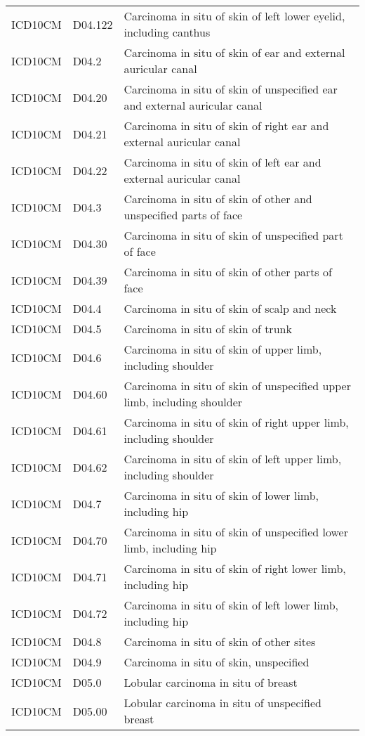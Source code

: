 \begin{longtable}{p{}p{}p{}}
  ICD10CM & D04.122 & Carcinoma in situ of skin of left lower eyelid, including canthus \\ 
  ICD10CM & D04.2 & Carcinoma in situ of skin of ear and external auricular canal \\ 
  ICD10CM & D04.20 & Carcinoma in situ of skin of unspecified ear and external auricular canal \\ 
  ICD10CM & D04.21 & Carcinoma in situ of skin of right ear and external auricular canal \\ 
  ICD10CM & D04.22 & Carcinoma in situ of skin of left ear and external auricular canal \\ 
  ICD10CM & D04.3 & Carcinoma in situ of skin of other and unspecified parts of face \\ 
  ICD10CM & D04.30 & Carcinoma in situ of skin of unspecified part of face \\ 
  ICD10CM & D04.39 & Carcinoma in situ of skin of other parts of face \\ 
  ICD10CM & D04.4 & Carcinoma in situ of skin of scalp and neck \\ 
  ICD10CM & D04.5 & Carcinoma in situ of skin of trunk \\ 
  ICD10CM & D04.6 & Carcinoma in situ of skin of upper limb, including shoulder \\ 
  ICD10CM & D04.60 & Carcinoma in situ of skin of unspecified upper limb, including shoulder \\ 
  ICD10CM & D04.61 & Carcinoma in situ of skin of right upper limb, including shoulder \\ 
  ICD10CM & D04.62 & Carcinoma in situ of skin of left upper limb, including shoulder \\ 
  ICD10CM & D04.7 & Carcinoma in situ of skin of lower limb, including hip \\ 
  ICD10CM & D04.70 & Carcinoma in situ of skin of unspecified lower limb, including hip \\ 
  ICD10CM & D04.71 & Carcinoma in situ of skin of right lower limb, including hip \\ 
  ICD10CM & D04.72 & Carcinoma in situ of skin of left lower limb, including hip \\ 
  ICD10CM & D04.8 & Carcinoma in situ of skin of other sites \\ 
  ICD10CM & D04.9 & Carcinoma in situ of skin, unspecified \\ 
  ICD10CM & D05.0 & Lobular carcinoma in situ of breast \\ 
  ICD10CM & D05.00 & Lobular carcinoma in situ of unspecified breast \\ 

\end{longtable}

